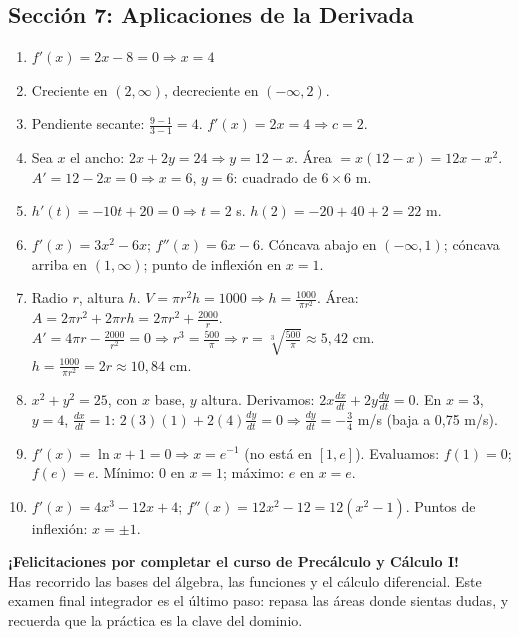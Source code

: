 \documentclass[12pt, letterpaper]{article}
\begin{document}
\subsection*{Sección 7: Aplicaciones de la Derivada}

\begin{enumerate}[resume=soluciones, leftmargin=*, label=\textbf{\arabic*.}]
  \item $f'(x) = 2x - 8 = 0 \Rightarrow x = 4$
  \item Creciente en $(2, \infty)$, decreciente en $(-\infty, 2)$.
  \item Pendiente secante: $\frac{9 - 1}{3 - 1} = 4$. $f'(x) = 2x = 4 \Rightarrow c = 2$.
  \item Sea $x$ el ancho: $2x + 2y = 24 \Rightarrow y = 12 - x$. Área $= x(12 - x) = 12x - x^2$. $A' = 12 - 2x = 0 \Rightarrow x = 6$, $y = 6$: cuadrado de $6 \times 6$ m.
  \item $h'(t) = -10t + 20 = 0 \Rightarrow t = 2$ s. $h(2) = -20 + 40 + 2 = 22$ m.
  \item $f'(x) = 3x^2 - 6x$; $f''(x) = 6x - 6$. Cóncava abajo en $(-\infty, 1)$; cóncava arriba en $(1, \infty)$; punto de inflexión en $x = 1$.
  \item Radio $r$, altura $h$. $V = \pi r^2 h = 1000 \Rightarrow h = \frac{1000}{\pi r^2}$. Área: $A = 2\pi r^2 + 2\pi r h = 2\pi r^2 + \frac{2000}{r}$. $A' = 4\pi r - \frac{2000}{r^2} = 0 \Rightarrow r^3 = \frac{500}{\pi} \Rightarrow r = \sqrt[3]{\frac{500}{\pi}} \approx 5{,}42$ cm. $h = \frac{1000}{\pi r^2} = 2r \approx 10{,}84$ cm.
  \item $x^2 + y^2 = 25$, con $x$ base, $y$ altura. Derivamos: $2x\frac{dx}{dt} + 2y\frac{dy}{dt} = 0$. En $x = 3$, $y = 4$, $\frac{dx}{dt} = 1$: $2(3)(1) + 2(4)\frac{dy}{dt} = 0 \Rightarrow \frac{dy}{dt} = -\frac{3}{4}$ m/s (baja a 0,75 m/s).
  \item $f'(x) = \ln x + 1 = 0 \Rightarrow x = e^{-1}$ (no está en $[1, e]$). Evaluamos: $f(1) = 0$; $f(e) = e$. Mínimo: $0$ en $x = 1$; máximo: $e$ en $x = e$.
  \item $f'(x) = 4x^3 - 12x + 4$; $f''(x) = 12x^2 - 12 = 12(x^2 - 1)$. Puntos de inflexión: $x = \pm 1$.
\end{enumerate}

\vspace{12pt}

\begin{cuadrosolucion}
  \textbf{¡Felicitaciones por completar el curso de Precálculo y Cálculo I!}\\
  Has recorrido las bases del álgebra, las funciones y el cálculo diferencial. Este examen final integrador es el último paso: repasa las áreas donde sientas dudas, y recuerda que la práctica es la clave del dominio.
\end{cuadrosolucion}
\end{document}
